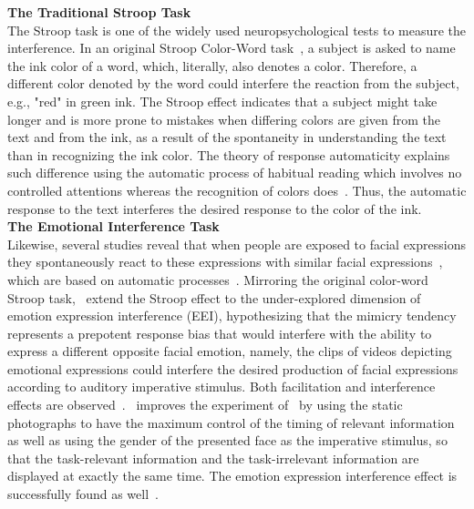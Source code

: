 \noindent\textbf{The Traditional Stroop Task}\\
The Stroop task is one of the widely used neuropsychological tests to measure the interference. In an original Stroop Color-Word task~\citep{macleod1991half}, a subject is asked to name the ink color of a word, which, literally, also denotes a color. Therefore, a different color denoted by the word could interfere the reaction from the subject, e.g., "red" in green ink. The Stroop effect indicates that a subject might take longer and is more prone to mistakes when differing colors are given from the text and from the ink, as a result of the spontaneity in understanding the text than in recognizing the ink color. The theory of response automaticity explains such difference using the automatic process of habitual reading which involves no controlled attentions whereas the recognition of colors does~\citep{cattell1886time, posner1975theories, shiffrin1977controlled}. Thus, the automatic response to the text interferes the desired response to the color of the ink.\\ 
			
\noindent\textbf{The Emotional Interference Task}\\
Likewise, several studies reveal that when people are exposed to facial expressions they spontaneously react to these expressions with similar facial expressions~\citep{dimberg2000unconscious,lundqvist1995facial,wild2001emotions}, which are based on automatic processes~\citep{dimberg2002facial}. Mirroring the original color-word Stroop task,~\citeauthor{lee2007controlling} extend the Stroop effect to the under-explored dimension of emotion expression interference (EEI), hypothesizing that the mimicry tendency represents a prepotent response bias that would interfere with the ability to express a different opposite facial emotion, namely, the clips of videos depicting emotional expressions could interfere the desired production of facial expressions according to auditory imperative stimulus. Both facilitation and interference effects are observed~\citep{lee2007controlling}.~\citeauthor{otte2011interference} improves the experiment of~\citeauthor{lee2007controlling} by using the static photographs to have the maximum control of the timing of relevant information as well as using the gender of the presented face as the imperative stimulus, so that the task-relevant information and the task-irrelevant information are displayed at exactly the same time. The emotion expression interference effect is successfully found as well~\citep{otte2011interference}.


